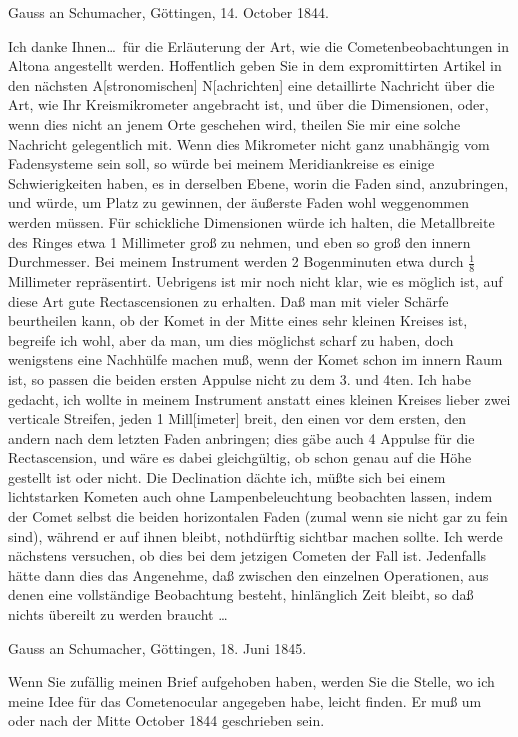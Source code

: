 \documentclass[12pt,a4paper]{article}
\theoremstyle{plain}
\theoremstyle{definition}
\theoremstyle{remark}
\begin{document}
Gauss an Schumacher, G\"ottingen, 14. October 1844.

Ich danke Ihnen\ldots\ f\"ur die Erl\"auterung der Art, wie die Cometenbeobachtungen in Altona angestellt werden. Hoffentlich geben Sie in dem expromittirten Artikel in den n\"achsten A[stronomischen] N[achrichten] eine detaillirte Nachricht \"uber die Art, wie Ihr Kreismikrometer angebracht ist, und \"uber die Dimensionen, oder, wenn dies nicht an jenem Orte geschehen wird, theilen Sie mir eine solche Nachricht gelegentlich mit. Wenn dies Mikrometer nicht ganz unabh\"angig vom Fadensysteme sein soll, so w\"urde bei meinem Meridiankreise es einige Schwierigkeiten haben, es in derselben Ebene, worin die Faden sind, anzubringen, und w\"urde, um Platz zu gewinnen, der \"au\ss erste Faden wohl weggenommen werden m\"ussen. F\"ur schickliche Dimensionen w\"urde ich halten, die Metallbreite des Ringes etwa 1 Millimeter gro\ss{} zu nehmen, und eben so gro\ss{} den innern Durchmesser. Bei meinem Instrument werden 2 Bogenminuten etwa durch $\tfrac{1}{8}$ Millimeter repr\"asentirt. Uebrigens ist mir noch nicht klar, wie es m\"oglich ist, auf diese Art gute Rectascensionen zu erhalten. Da\ss{} man mit vieler Sch\"arfe beurtheilen kann, ob der Komet in der Mitte eines sehr kleinen Kreises ist, begreife ich wohl, aber da man, um dies m\"oglichst scharf zu haben, doch wenigstens eine Nachh\"ulfe machen mu\ss, wenn der Komet schon im innern Raum ist, so passen die beiden ersten Appulse nicht zu dem 3. und 4ten. Ich habe gedacht, ich wollte in meinem Instrument anstatt eines kleinen Kreises lieber zwei verticale Streifen, jeden 1 Mill[imeter] breit, den einen vor dem ersten, den andern nach dem letzten Faden anbringen; dies g\"abe auch 4 Appulse f\"ur die Rectascension, und w\"are es dabei gleichg\"ultig, ob schon genau auf die H\"ohe gestellt ist oder nicht. Die Declination d\"achte ich, m\"u\ss te sich bei einem lichtstarken Kometen auch ohne Lampenbeleuchtung beobachten lassen, indem der Comet selbst die beiden horizontalen Faden (zumal wenn sie nicht gar zu fein sind), w\"ahrend er auf ihnen bleibt, nothd\"urftig sichtbar machen sollte. Ich werde n\"achstens versuchen, ob dies bei dem jetzigen Cometen der Fall ist. Jedenfalls h\"atte dann dies das Angenehme, da\ss{} zwischen den einzelnen Operationen, aus denen eine vollst\"andige Beobachtung besteht, hinl\"anglich Zeit bleibt, so da\ss{} nichts \"ubereilt zu werden braucht \ldots\ \grqq

Gauss an Schumacher, G\"ottingen, 18. Juni 1845.

\glqq Wenn Sie zuf\"allig meinen Brief aufgehoben haben, werden Sie die Stelle, wo ich meine Idee f\"ur das Cometenocular angegeben habe, leicht finden. Er mu\ss{} um oder nach der Mitte October 1844 geschrieben sein.
\end{document}
